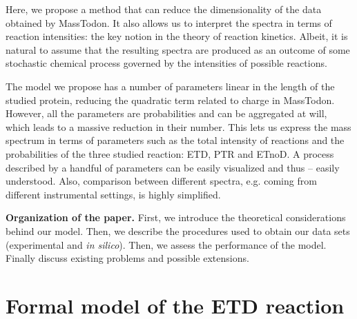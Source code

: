 \documentclass{llncs}
\begin{document}
Here, we propose a method that can reduce the dimensionality of the data obtained by {\sc MassTodon}. It also allows us to interpret the spectra in terms of reaction intensities: the key notion in the theory of reaction kinetics. Albeit, it is natural to assume that the resulting spectra are produced as an outcome of some stochastic chemical process governed by the intensities of possible reactions.

The model we propose has a number of parameters linear in the length of the studied protein, reducing the quadratic term related to charge in {\sc MassTodon}. However, all the parameters are probabilities and can be aggregated at will, which leads to a massive reduction in their number. This lets us express the mass spectrum in terms of parameters such as the total intensity of reactions and the probabilities of the three studied reaction: ETD, PTR and ETnoD. A process described by a handful of parameters can be easily visualized and thus -- easily understood. Also, comparison between different spectra, e.g. coming from different instrumental settings, is highly simplified.

\textbf{Organization of the paper.}
First, we introduce the theoretical considerations behind our model. Then, we describe the procedures used to obtain our data sets (experimental and \textit{in silico}). Then, we assess the performance of the model. Finally discuss existing problems and possible extensions.


\section{Formal model of the ETD reaction}
\end{document}
